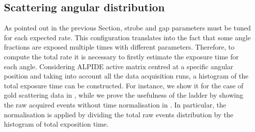 \documentclass[../../main/main.tex]{subfiles}
\begin{document}
\subsection{Scattering angular distribution}
As pointed out in the previous Section, strobe and gap parameters must be tuned for each expected rate. This configuration translates into the fact that some angle fractions are exposed multiple times with different parameters.
Therefore, to compute the total rate it is necessary to firstly estimate the exposure time for each angle. Considering ALPIDE active matrix centred at a specific angular position and taking into account all the data acquisition runs, a histogram of the total exposure time can be constructed. For instance, we show it for the case of gold scattering data in , while we prove the usefulness of the ladder by showing the raw acquired events without time normalisation in .
In particular, the normalisation is applied by dividing the total raw events distribution by the histogram of total exposition time.
\end{document}
